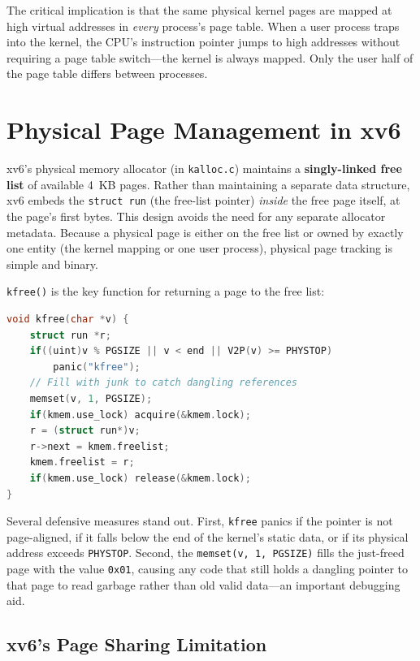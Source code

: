 \documentclass[11pt]{article}
\begin{document}
The critical implication is that the same physical kernel pages are mapped at high virtual addresses in \emph{every} process's page table. When a user process traps into the kernel, the CPU's instruction pointer jumps to high addresses without requiring a page table switch---the kernel is always mapped. Only the user half of the page table differs between processes.

\section{Physical Page Management in xv6}

xv6's physical memory allocator (in \texttt{kalloc.c}) maintains a \textbf{singly-linked free list} of available 4~KB pages. Rather than maintaining a separate data structure, xv6 embeds the \texttt{struct run} (the free-list pointer) \emph{inside} the free page itself, at the page's first bytes. This design avoids the need for any separate allocator metadata. Because a physical page is either on the free list or owned by exactly one entity (the kernel mapping or one user process), physical page tracking is simple and binary.

\texttt{kfree()} is the key function for returning a page to the free list:

\begin{lstlisting}[language=C, caption={kfree() in kalloc.c}]
void kfree(char *v) {
    struct run *r;
    if((uint)v % PGSIZE || v < end || V2P(v) >= PHYSTOP)
        panic("kfree");
    // Fill with junk to catch dangling references
    memset(v, 1, PGSIZE);
    if(kmem.use_lock) acquire(&kmem.lock);
    r = (struct run*)v;
    r->next = kmem.freelist;
    kmem.freelist = r;
    if(kmem.use_lock) release(&kmem.lock);
}
\end{lstlisting}

Several defensive measures stand out. First, \texttt{kfree} panics if the pointer is not page-aligned, if it falls below the end of the kernel's static data, or if its physical address exceeds \texttt{PHYSTOP}. Second, the \texttt{memset(v, 1, PGSIZE)} fills the just-freed page with the value \texttt{0x01}, causing any code that still holds a dangling pointer to that page to read garbage rather than old valid data---an important debugging aid.

\subsection{xv6's Page Sharing Limitation}
\end{document}
